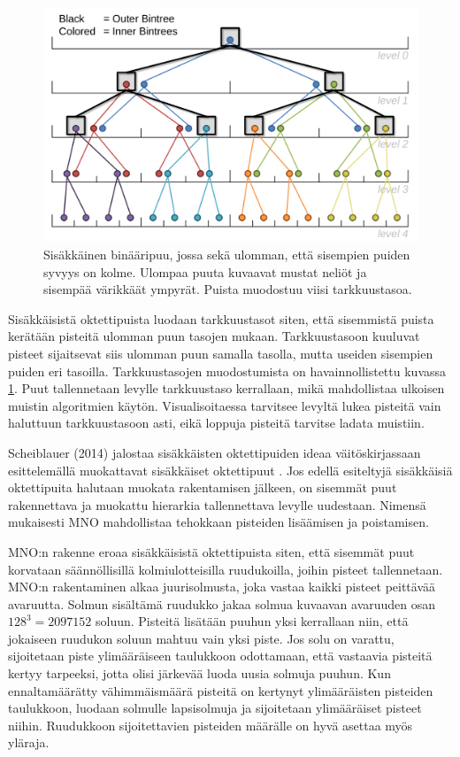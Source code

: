 \begin{figure}
    \centering
    \includegraphics[width=0.6\paperwidth]{img/nested.png}
    \caption{Sisäkkäinen binääripuu, jossa sekä ulomman, että sisempien puiden syvyys on kolme. Ulompaa puuta kuvaavat mustat neliöt ja sisempää värikkäät ympyrät. Puista muodostuu viisi tarkkuustasoa. \cite{scheiblauer}}
    \label{nested}
\end{figure}

Sisäkkäisistä oktettipuista luodaan tarkkuustasot siten, että sisemmistä puista kerätään pisteitä ulomman puun tasojen mukaan. Tarkkuustasoon kuuluvat pisteet sijaitsevat siis ulomman puun samalla tasolla, mutta useiden sisempien puiden eri tasoilla. Tarkkuustasojen muodostumista on havainnollistettu kuvassa \ref{nested}. Puut tallennetaan levylle tarkkuustaso kerrallaan, mikä mahdollistaa ulkoisen muistin algoritmien käytön. Visualisoitaessa tarvitsee levyltä lukea pisteitä vain haluttuun tarkkuustasoon asti, eikä loppuja pisteitä tarvitse ladata muistiin. \cite{ip}

Scheiblauer (2014) jalostaa sisäkkäisten oktettipuiden ideaa väitöskirjassaan esittelemällä muokattavat sisäkkäiset oktettipuut . Jos edellä esiteltyjä sisäkkäisiä oktettipuita halutaan muokata rakentamisen jälkeen, on sisemmät puut rakennettava ja muokattu hierarkia tallennettava levylle uudestaan. Nimensä mukaisesti MNO mahdollistaa tehokkaan pisteiden lisäämisen ja poistamisen. \cite{scheiblauer} 

MNO:n rakenne eroaa sisäkkäisistä oktettipuista siten, että sisemmät puut korvataan säännöllisillä kolmiulotteisilla ruudukoilla, joihin pisteet tallennetaan. MNO:n rakentaminen alkaa juurisolmusta, joka vastaa kaikki pisteet peittävää avaruutta. Solmun sisältämä ruudukko jakaa solmua kuvaavan avaruuden osan $128^3 = 2 097 152$ soluun. Pisteitä lisätään puuhun yksi kerrallaan niin, että jokaiseen ruudukon soluun mahtuu vain yksi piste. Jos solu on varattu, sijoitetaan piste ylimääräiseen taulukkoon odottamaan, että vastaavia pisteitä kertyy tarpeeksi, jotta olisi järkevää luoda uusia solmuja puuhun. Kun ennaltamäärätty vähimmäismäärä pisteitä on kertynyt ylimääräisten pisteiden taulukkoon, luodaan solmulle lapsisolmuja ja sijoitetaan ylimääräiset pisteet niihin. Ruudukkoon sijoitettavien pisteiden määrälle on hyvä asettaa myös yläraja. \cite{scheiblauer}

